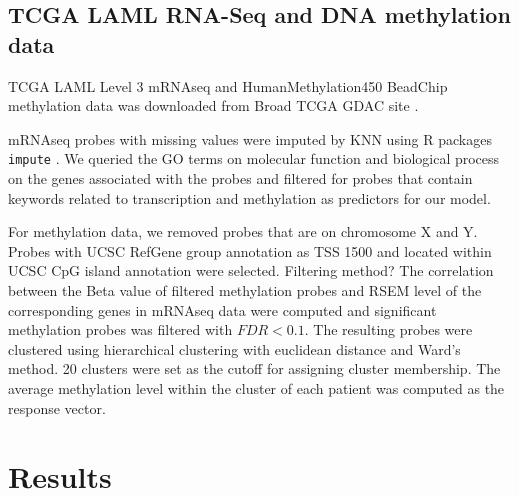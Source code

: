 \documentclass{article}
\begin{document}
\subsection{TCGA LAML RNA-Seq and DNA methylation data}

TCGA LAML Level 3 mRNAseq and HumanMethylation450 BeadChip methylation data was downloaded from Broad TCGA GDAC site \citep{bitgda2016analysis}. 

mRNAseq probes with missing values were imputed by KNN using R packages \texttt{impute} \citep{hastie2001impute}. We queried the GO terms on molecular function and biological process on the genes associated with the probes and filtered for probes that contain keywords related to transcription and methylation as predictors for our model.  

For methylation data, we removed probes that are on chromosome X and Y. Probes with UCSC RefGene group annotation as TSS 1500 and located within UCSC CpG island annotation were selected. {\color{red} Filtering method?} The correlation between the Beta value of filtered methylation probes and RSEM level of the corresponding genes in mRNAseq data were computed and significant methylation probes was filtered with $FDR < 0.1$. The resulting probes were clustered using hierarchical clustering with euclidean distance and Ward's method. 20 clusters were set as the cutoff for assigning cluster membership. The average methylation level within the cluster of each patient was computed as the response vector. 


\section{Results}
\end{document}
